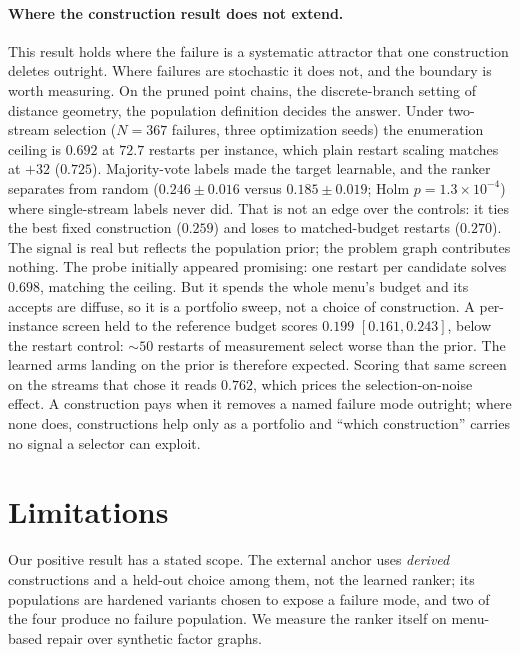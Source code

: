 \documentclass[letterpaper]{article} %
\begin{document}
\paragraph{Where the construction result does not extend.}
This result holds where the failure is a systematic attractor that one construction deletes
outright. Where failures are stochastic it does not, and the boundary is worth measuring.
On the pruned point chains, the discrete-branch setting of distance geometry, the
population definition decides the answer. Under two-stream selection ($N{=}367$ failures, three optimization seeds) the enumeration
ceiling is $0.692$ at $72.7$ restarts per instance, which plain restart scaling matches at
$+32$ ($0.725$). Majority-vote labels made the target learnable, and the ranker separates from random
($0.246 \pm 0.016$ versus $0.185 \pm 0.019$; Holm $p{=}1.3{\times}10^{-4}$) where
single-stream labels never did. That is not an edge over the controls: it ties the best
fixed construction ($0.259$) and loses to matched-budget restarts ($0.270$). The signal is real but
reflects the population prior; the problem graph contributes nothing. The probe initially
appeared promising: one restart per candidate solves $0.698$, matching the ceiling. But it spends the whole menu's budget and its accepts are diffuse, so it is a portfolio
sweep, not a choice of construction. A per-instance screen held to the reference budget
scores $0.199$ $[0.161, 0.243]$, below the restart control: ${\sim}50$ restarts of
measurement select worse than the prior. The learned arms landing on the prior is therefore expected. Scoring that same screen on
the streams that chose it reads $0.762$, which prices the selection-on-noise effect. A
construction pays when it removes a named failure mode outright; where none does,
constructions help only as a portfolio and ``which construction'' carries no signal a
selector can exploit.

\section{Limitations}
\label{sec:limitations}

Our positive result has a stated scope. The external anchor uses \emph{derived} constructions
and a held-out choice among them, not the learned ranker; its populations are hardened
variants chosen to expose a failure mode, and two of the four produce no failure population. We measure the ranker itself on menu-based repair over synthetic factor
graphs.
\end{document}
